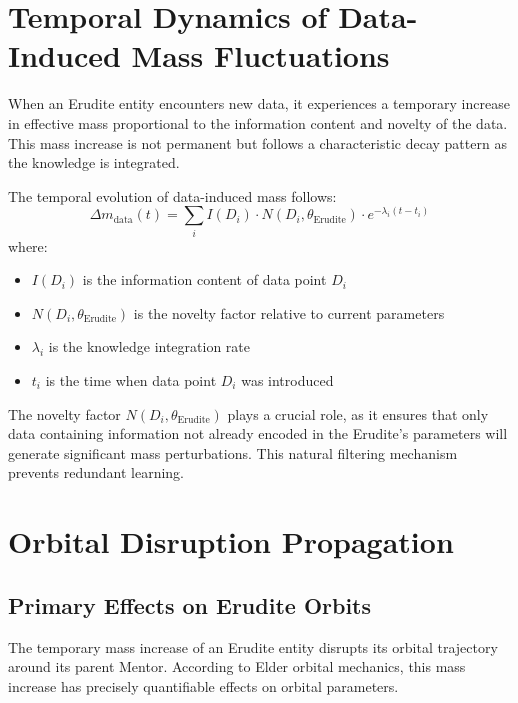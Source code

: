 \section{Temporal Dynamics of Data-Induced Mass Fluctuations}

When an Erudite entity encounters new data, it experiences a temporary increase in effective mass proportional to the information content and novelty of the data. This mass increase is not permanent but follows a characteristic decay pattern as the knowledge is integrated.

\begin{proposition}
The temporal evolution of data-induced mass follows:
\begin{equation}
\Delta m_{\text{data}}(t) = \sum_{i} I(D_i) \cdot N(D_i, \theta_{\text{Erudite}}) \cdot e^{-\lambda_i(t-t_i)}
\end{equation}
where:
\begin{itemize}
    \item $I(D_i)$ is the information content of data point $D_i$
    \item $N(D_i, \theta_{\text{Erudite}})$ is the novelty factor relative to current parameters
    \item $\lambda_i$ is the knowledge integration rate
    \item $t_i$ is the time when data point $D_i$ was introduced
\end{itemize}
\end{proposition}

The novelty factor $N(D_i, \theta_{\text{Erudite}})$ plays a crucial role, as it ensures that only data containing information not already encoded in the Erudite's parameters will generate significant mass perturbations. This natural filtering mechanism prevents redundant learning.

\section{Orbital Disruption Propagation}

\subsection{Primary Effects on Erudite Orbits}

The temporary mass increase of an Erudite entity disrupts its orbital trajectory around its parent Mentor. According to Elder orbital mechanics, this mass increase has precisely quantifiable effects on orbital parameters.


